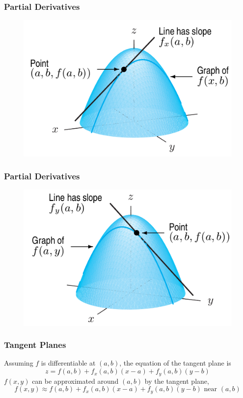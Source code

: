 \documentclass[xcolor=dvipsnames]{beamer}
\begin{document}
\begin{frame}
  \frametitle{Partial Derivatives}
  \begin{figure}[h]
    \includegraphics[scale=0.5]{./diagrams/partialx.png}
  \end{figure}
\end{frame}

\begin{frame}
  \frametitle{Partial Derivatives}
  \begin{figure}[h]
    \includegraphics[scale=0.5]{./diagrams/partialy.png}
  \end{figure}
\end{frame}

\begin{frame}
  \frametitle{Tangent Planes}
  Assuming $f$ is differentiable at $(a,b)$, the equation of the
  tangent plane is
  \begin{equation}
    \label{eq:aoseenai}
z=f(a,b)+f_{x}(a,b)(x-a)+f_{y}(a,b)(y-b)
  \end{equation}
  $f(x,y)$ can be approximated around $(a,b)$ by the tangent plane,
  \begin{equation}
    \label{eq:xabixaic}
    f(x,y)\approx{}f(a,b)+f_{x}(a,b)(x-a)+f_{y}(a,b)(y-b)\mbox{ near }(a,b)
  \end{equation}
\end{frame}
\end{document}
